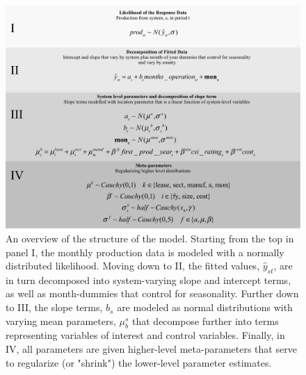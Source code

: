 \documentclass[a4paper]{article}
\begin{document}
\begin{figure}
  \centering
	\includegraphics[width=1\textwidth]{figures/solar_prod_hierarchy.png}
	\caption{An overview of the structure of the model. Starting from the top in panel I, the monthly production data is modeled with a normally distributed likelihood. Moving down to II, the fitted values, $\hat{y}_{st}$, are in turn decomposed into system-varying slope and intercept terms, as well as month-dummies that control for seasonality. Further down to III, the slope terms, $b_s$ are modeled as normal distributions with varying mean parameters, $\mu_b^s$ that decompose further into terms representing variables of interest and control variables. Finally, in IV, all parameters are given higher-level meta-parameters that serve to regularize (or "shrink") the lower-level parameter estimates.}
	\label{solar_prod_hierarchy}
\end{figure}
\end{document}
